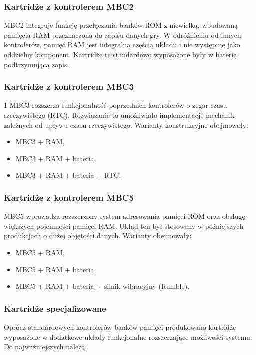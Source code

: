 \documentclass{article}
\begin{document}
\subsubsection{Kartridże z kontrolerem MBC2}

MBC2 integruje funkcję przełączania banków ROM z niewielką, wbudowaną pamięcią RAM przeznaczoną do zapisu danych gry. W odróżnieniu od innych kontrolerów, pamięć RAM jest integralną częścią układu i nie występuje jako oddzielny komponent. Kartridże te standardowo wyposażone były w baterię podtrzymującą zapis.

\subsubsection{Kartridże z kontrolerem MBC3}
1
MBC3 rozszerza funkcjonalność poprzednich kontrolerów o zegar czasu rzeczywistego (RTC). Rozwiązanie to umożliwiało implementację mechanik zależnych od upływu czasu rzeczywistego. Warianty konstrukcyjne obejmowały:

\begin{itemize}
	\item MBC3 + RAM,
	\item MBC3 + RAM + bateria,
	\item MBC3 + RAM + bateria + RTC.
\end{itemize}

\subsubsection{Kartridże z kontrolerem MBC5}

MBC5 wprowadza rozszerzony system adresowania pamięci ROM oraz obsługę większych pojemności pamięci RAM. Układ ten był stosowany w późniejszych produkcjach o dużej objętości danych. Warianty obejmowały:

\begin{itemize}
	\item MBC5 + RAM,
	\item MBC5 + RAM + bateria,
	\item MBC5 + RAM + bateria + silnik wibracyjny (Rumble).
\end{itemize}

\subsubsection{Kartridże specjalizowane}

Oprócz standardowych kontrolerów banków pamięci produkowano kartridże wyposażone w dodatkowe układy funkcjonalne rozszerzające możliwości systemu. Do najważniejszych należą:
\end{document}
